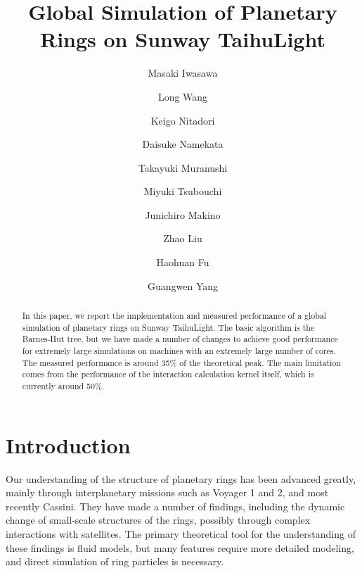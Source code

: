 \documentclass[oribibl]{llncs}
\begin{document}
\title{Global Simulation of Planetary Rings on Sunway TaihuLight}

\author{Masaki Iwasawa  \and Long Wang  \and Keigo
  Nitadori  \and Daisuke Namekata  \and Takayuki
  Muranushi  \and Miyuki Tsubouchi  \and Junichiro
  Makino  \and Zhao Liu  \and Haohuan Fu
   \and Guangwen Yang }


\maketitle

\begin{abstract}

  In this paper, we report the implementation and measured performance
  of a global simulation of planetary rings on Sunway TaihuLight.  The
  basic algorithm is the Barnes-Hut tree, but we have made a number of
  changes to achieve good performance for extremely large simulations
  on machines with an extremely large number of cores.  The measured
  performance is around 35\% of the theoretical peak. The main
  limitation comes from the performance of the interaction calculation
  kernel itself, which is currently around 50\%.

\end{abstract}

\section{Introduction}
\label{sect:intro}

Our understanding of the structure of planetary rings has been advanced
greatly, mainly through interplanetary missions such as Voyager 1 and
2, and most recently Cassini. They have made a number of findings,
including the dynamic change of small-scale structures of the rings,
possibly through complex interactions with satellites. The primary
theoretical tool for the understanding of these findings is fluid
models, but many features require more detailed modeling, and direct
simulation of ring particles is necessary.
\end{document}
